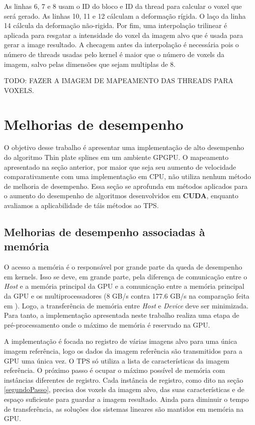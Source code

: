   As linhas 6, 7 e 8 usam o ID do bloco e ID da thread para calcular o voxel que será
gerado. As linhas 10, 11 e 12 cálculam a deformação rígida. O laço da linha 14
cálcula da deformação não-rigida. Por fim, uma interpolação trilinear é aplicada
para resgatar a intensidade do voxel da imagem alvo que é usada para gerar a image
resultado. A checagem antes da interpolação é necessária pois o número de threads
usadas pelo kernel é maior que o número de voxels da imagem, salvo pelas dimensões
que sejam multiplas de 8.

  TODO: FAZER A IMAGEM DE MAPEAMENTO DAS THREADS PARA VOXELS.

\section{Melhorias de desempenho}\label{melhoriaDesempenho}

  O objetivo desse trabalho é apresentar uma implementação de alto desempenho
do algoritmo Thin plate splines em um ambiente GPGPU. O mapeamento apresentado
na seção anterior, por maior que seja seu aumento de velocidade comparativamente
com uma implementação em CPU, não utiliza nenhum método de melhoria de desempenho.
Essa seção se aprofunda em métodos aplicados para o aumento do desempenho de
algoritmos desenvolvidos em \textbf{CUDA}, enquanto avaliamos a aplicabilidade
de táis métodos ao TPS.

\subsection{Melhorias de desempenho associadas à memória}

O acesso a memória é o responsável por grande parte da queda de desempenho
em kernels. Isso se deve, em grande parte, pela diferença de comunicação entre o
\textit{Host} e a memória principal da GPU e a comunicação entre a memória
principal da GPU e os multiprocessadores
(8 GB/s contra 177.6 GB/s na comparação feita em \cite{cudaBestPractices}). Logo,
a transferência de memória entre \textit{Host} e \textit{Device} deve ser
minimizada. Para tanto, a implementação apresentada neste trabalho realiza uma
etapa de pré-processamento onde o máximo de memória é reservado na GPU.

A implementação é focada no registro de várias imagens alvo para uma única
imagem referência, logo os dados da imagem referência são transmitidos para a
GPU uma única vez. O TPS só utiliza a lista de características da imagem referência.
O próximo passo é ocupar o máximo possível de memória com instâncias diferentes
de registro. Cada instância de registro, como dito na seção \ref{segundoPasso},
precisa dos voxels da imagem alvo, das suas características e de espaço suficiente
para guardar a imagem resultado. Ainda para diminuir o tempo de transferência,
as soluções dos sistemas lineares são mantidos em memória na GPU.

